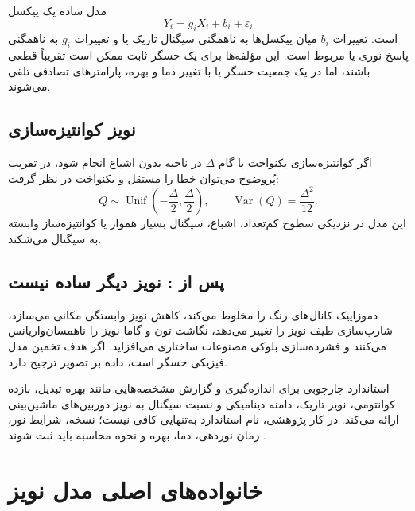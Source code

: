 \documentclass[12pt,openany,oneside]{book}
\newcommand{\Var}{\operatorname{Var}}
\begin{document}
مدل ساده یک پیکسل
\begin{equation}
Y_i=g_i X_i+b_i+\varepsilon_i
\end{equation}
است. تغییرات \(b_i\) میان پیکسل‌ها به ناهمگنی سیگنال تاریک یا  و تغییرات \(g_i\) به ناهمگنی
پاسخ نوری یا  مربوط است. این مؤلفه‌ها برای یک حسگر ثابت ممکن است تقریباً قطعی باشند، اما در یک
جمعیت حسگر یا با تغییر دما و بهره، پارامترهای تصادفی تلقی می‌شوند.

\subsection{نویز کوانتیزه‌سازی}

اگر کوانتیزه‌سازی یکنواخت با گام \(\Delta\) در ناحیه بدون اشباع انجام شود، در تقریب پُروضوح می‌توان خطا را
مستقل و یکنواخت در نظر گرفت:
\begin{equation}
Q\sim\operatorname{Unif}\left(-\frac\Delta2,\frac\Delta2\right),
\qquad
\Var(Q)=\frac{\Delta^2}{12}.
\end{equation}
این مدل در نزدیکی سطوح کم‌تعداد، اشباع، سیگنال بسیار هموار یا کوانتیزه‌ساز وابسته به سیگنال می‌شکند.

\subsection{پس از : نویز دیگر ساده نیست}

دموزاییک کانال‌های رنگ را مخلوط می‌کند، کاهش نویز وابستگی مکانی می‌سازد، شارپ‌سازی طیف نویز را تغییر می‌دهد،
نگاشت تون و گاما نویز را ناهمسان‌واریانس می‌کنند و فشرده‌سازی بلوکی مصنوعات ساختاری می‌افزاید. اگر هدف تخمین
مدل فیزیکی حسگر است، داده  بر تصویر  ترجیح دارد.

\begin{researchbox}
استاندارد  چارچوبی برای اندازه‌گیری و گزارش مشخصه‌هایی مانند بهره تبدیل، بازده کوانتومی،
نویز تاریک، دامنه دینامیکی و نسبت سیگنال به نویز دوربین‌های ماشین‌بینی ارائه می‌کند. در کار پژوهشی، نام استاندارد
به‌تنهایی کافی نیست؛ نسخه، شرایط نور، زمان نوردهی، دما، بهره و نحوه محاسبه باید ثبت شوند \cite{emva1288}.
\end{researchbox}

\section{خانواده‌های اصلی مدل نویز}
\end{document}
